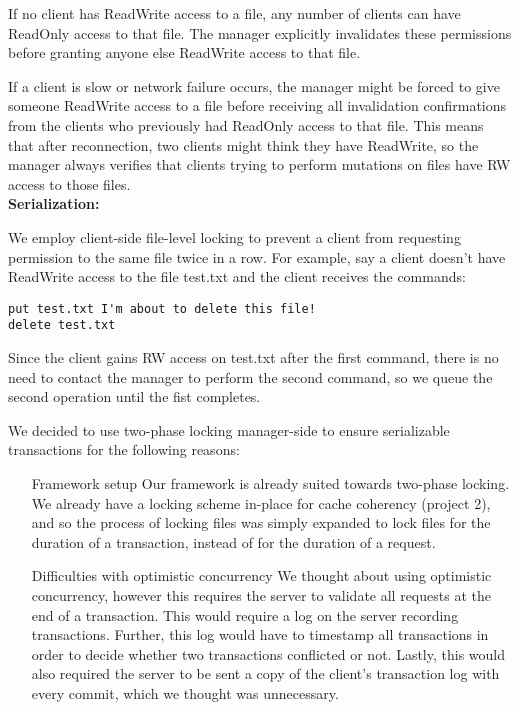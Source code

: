 \documentclass[11pt]{article}
\begin{document}
If no client has ReadWrite access to a file, any number of clients can have ReadOnly access to that file.
The manager explicitly invalidates these permissions before granting anyone else ReadWrite access to that file.

If a client is slow or network failure occurs, the manager might be forced to give someone ReadWrite access to a file before receiving all invalidation confirmations from the clients who previously had ReadOnly access to that file. This means that after reconnection, two clients might think they have ReadWrite, so the manager always verifies that clients trying to perform mutations on files have RW access to those files. \\

\textbf{Serialization:}

We employ client-side file-level locking to prevent a client from requesting permission to the same file twice in a row.
For example, say a client doesn't have ReadWrite access to the file test.txt and the client receives the commands:

\begin{verbatim}
put test.txt I'm about to delete this file!
delete test.txt
\end{verbatim}

Since the client gains RW access on test.txt after the first command, there is no need to contact the manager to perform the second command, so we queue the second operation until the fist completes.

We decided to use two-phase locking manager-side to ensure serializable transactions for the following reasons:

\begin{enumerate}
	\item[Framework setup] Our framework is already suited towards two-phase locking. We already have a locking scheme in-place for cache coherency (project 2), and so the process of locking files was 
simply expanded to lock files for the duration of a transaction, instead of for the duration of a request.
	\item[Difficulties with optimistic concurrency] We thought about using optimistic concurrency, however this requires the server to validate all requests at the end of a transaction. This would require
a log on the server recording transactions. Further, this log would have to timestamp all transactions in order to decide whether two transactions conflicted or not. Lastly, this would also required the
server to be sent a copy of the client's transaction log with every commit, which we thought was unnecessary.
\end{enumerate}
\end{document}
